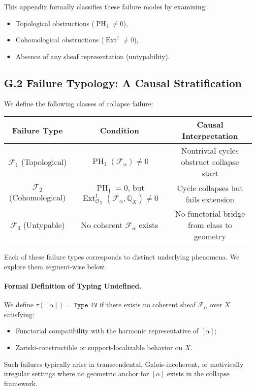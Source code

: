 \documentclass[11pt]{article}
\DeclareMathOperator{\Ext}{Ext}
\DeclareMathOperator{\PH}{PH}
\begin{document}
This appendix formally classifies these failure modes by examining:

\begin{itemize}
  \item Topological obstructions ($\PH_1 \ne 0$),
  \item Cohomological obstructions ($\Ext^1 \ne 0$),
  \item Absence of any sheaf representation (untypability).
\end{itemize}

\subsection*{G.2 Failure Typology: A Causal Stratification}

We define the following classes of collapse failure:

\begin{center}
\renewcommand{\arraystretch}{1.3}
\begin{tabular}{|c|c|c|}
\hline
\textbf{Failure Type} & \textbf{Condition} & \textbf{Causal Interpretation} \\
\hline \hline
$\mathcal{F}_1$ (Topological) & $\PH_1(\mathcal{F}_\alpha) \ne 0$ & Nontrivial cycles obstruct collapse start \\
\hline
$\mathcal{F}_2$ (Cohomological) & $\PH_1 = 0$, but $\Ext^1_{\mathcal{O}_X}(\mathcal{F}_\alpha, \mathbb{Q}_X) \ne 0$ & Cycle collapses but fails extension \\
\hline
$\mathcal{F}_3$ (Untypable) & No coherent $\mathcal{F}_\alpha$ exists & No functorial bridge from class to geometry \\
\hline
\end{tabular}
\end{center}

Each of these failure types corresponds to distinct underlying phenomena. We explore them segment-wise below.

\paragraph{Formal Definition of Typing Undefined.}
We define $\tau([\alpha]) = \texttt{Type IV}$ if there exists no coherent sheaf $\mathcal{F}_\alpha$ over $X$ satisfying:
\begin{itemize}
  \item Functorial compatibility with the harmonic representative of $[\alpha]$;
  \item Zariski-constructible or support-localizable behavior on $X$.
\end{itemize}
Such failures typically arise in transcendental, Galois-incoherent, or motivically irregular settings where no geometric anchor for $[\alpha]$ exists in the collapse framework.
\end{document}
